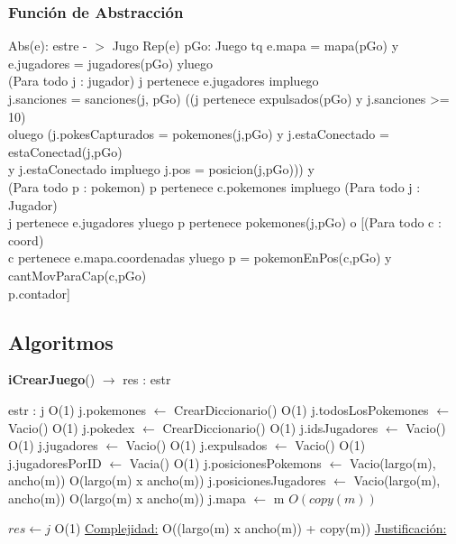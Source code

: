 \begin{Representacion}
\begin{enumerate}
	\end{enumerate}
	
\subsubsection{Funci\'on de Abstracci\'on}	
	Abs(e): estre - $>$ Jugo {Rep(e)} 
 pGo: Juego tq e.mapa = mapa(pGo) y e.jugadores = jugadores(pGo) yluego \\
 (Para todo j : jugador) j pertenece e.jugadores impluego 
 \\ j.sanciones = sanciones(j, pGo) ((j pertenece expulsados(pGo) y j.sanciones >= 10)\\
 oluego (j.pokesCapturados = pokemones(j,pGo) y j.estaConectado = estaConectad(j,pGo) \\
 y j.estaConectado impluego j.pos = posicion(j,pGo))) y \\
 (Para todo p : pokemon) p pertenece c.pokemones impluego (Para todo j : Jugador) \\
 j pertenece e.jugadores yluego p pertenece pokemones(j,pGo) o [(Para todo c : coord)\\
 c pertenece e.mapa.coordenadas yluego p = pokemonEnPos(c,pGo) y cantMovParaCap(c,pGo)\\
 p.contador]
\end{Representacion}


\subsection{Algoritmos}

\begin{algorithm}[H]{\textbf{iCrearJuego}() $\to$ res : estr}
	\begin{algorithmic}
		\State estr : j	\Comment O(1)
		\State j.pokemones $\gets$ CrearDiccionario()	\Comment O(1)
		\State j.todosLosPokemones $\gets$ Vacio()	\Comment O(1)
		\State j.pokedex $\gets$ CrearDiccionario()	\Comment O(1)		
		\State j.idsJugadores $\gets$ Vacio()	\Comment O(1)		
		\State j.jugadores $\gets$ Vacio()	\Comment O(1)
		\State j.expulsados $\gets$ Vacio()	\Comment O(1)
		\State j.jugadoresPorID $\gets$ Vacia()	\Comment O(1)
		\State j.posicionesPokemons $\gets$	Vacio(largo(m), ancho(m))	\Comment O(largo(m) x ancho(m))
		\State j.posicionesJugadores $\gets$	Vacio(largo(m), ancho(m))	\Comment O(largo(m) x ancho(m))
		\State j.mapa $\gets$ m	\Comment $O(copy(m))$

		\State $res \gets j$ \Comment O(1)
		\medskip
		\Statex \underline{Complejidad:} O((largo(m) x ancho(m)) + copy(m))
		\Statex \underline{Justificación:} 

    \end{algorithmic}
\end{algorithm}

